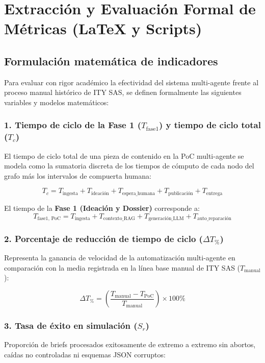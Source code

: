 \documentclass[11pt,a4paper]{article}
\begin{document}
\section{Extracción y Evaluación Formal de Métricas (LaTeX y Scripts)}
\label{sec:extraccion_metricas}

\subsection{Formulación matemática de indicadores}
Para evaluar con rigor académico la efectividad del sistema multi-agente frente al proceso manual histórico de ITY SAS, se definen formalmente las siguientes variables y modelos matemáticos:

\subsubsection{1. Tiempo de ciclo de la Fase 1 ($T_{\text{fase1}}$) y tiempo de ciclo total ($T_c$)}
El tiempo de ciclo total de una pieza de contenido en la PoC multi-agente se modela como la sumatoria discreta de los tiempos de cómputo de cada nodo del grafo más los intervalos de compuerta humana:

\begin{equation}
    T_c = T_{\text{ingesta}} + T_{\text{ideación}} + T_{\text{espera\_humana}} + T_{\text{publicación}} + T_{\text{entrega}}
\end{equation}

El tiempo de la \textbf{Fase 1 (Ideación y Dossier)} corresponde a:
\begin{equation}
    T_{\text{fase1, PoC}} = T_{\text{ingesta}} + T_{\text{contexto\_RAG}} + T_{\text{generación\_LLM}} + T_{\text{auto\_reparación}}
\end{equation}

\subsubsection{2. Porcentaje de reducción de tiempo de ciclo ($\Delta T_{\%}$)}
Representa la ganancia de velocidad de la automatización multi-agente en comparación con la media registrada en la línea base manual de ITY SAS ($T_{\text{manual}}$):

\begin{equation}
    \Delta T_{\%} = \left( \frac{T_{\text{manual}} - T_{\text{PoC}}}{T_{\text{manual}}} \right) \times 100\%
\end{equation}

\subsubsection{3. Tasa de éxito en simulación ($S_r$)}
Proporción de briefs procesados exitosamente de extremo a extremo sin abortos, caídas no controladas ni esquemas JSON corruptos:
\end{document}

